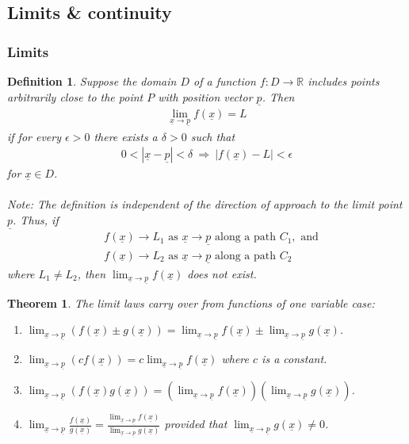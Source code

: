 \documentclass{article}
\theoremstyle{sltheorem}
\newtheorem{definition}{Definition}[section]
\newtheorem{theorem}{Theorem}[section]
\newcommand{\R}{\mathbb{R}}
\renewcommand{\vec}{\underline}
\begin{document}
\subsection{Limits \& continuity}
\subsubsection{Limits}
\begin{definition}
    Suppose the domain $D$ of a function $f:D\to\R$ includes points
    arbitrarily close to the point $P$ with position vector $\vec p$.
    Then
    \begin{align*}
        \lim_{\vec x\to \vec p}f(\vec x)=L
    \end{align*}
    if for every $\epsilon>0$ there exists a $\delta > 0$ such that
    \begin{align*}
        0 < |\vec x - \vec p| < \delta \:\Rightarrow\: |f(\vec x)-L|<\epsilon
    \end{align*}
    for $\vec x \in D$.\\\\
    Note: The definition is independent of the direction of approach to the
    limit point $\vec p$. Thus, if
    \begin{align*}
        &f(\vec x)\to L_1 \text{ as } \vec x\to\vec p \text{ along a path } C_1, \text{ and}\\
        &f(\vec x)\to L_2 \text{ as } \vec x\to\vec p \text{ along a path } C_2
    \end{align*}
    where $L_1 \not= L_2$, then $\lim_{\vec x\to\vec p} f(\vec x)$ does not exist.
\end{definition}
\begin{theorem}
    The limit laws carry over from functions of one variable case:
    \begin{enumerate}
        \item $\lim_{\vec x\to\vec p}\left(f(\vec x)\pm g(\vec x)\right) =
               \lim_{\vec x\to\vec p}f(\vec x)\pm\lim_{\vec x\to\vec p}g(\vec x)$.
        \item $\lim_{\vec x\to\vec p}\left(cf(\vec x)\right) =
              c\lim_{\vec x\to\vec p}f(\vec x)$ where $c$ is a constant.
        \item $\lim_{\vec x\to\vec p}\left(f(\vec x)g(\vec x)\right) =
               \left(\lim_{\vec x\to\vec p}f(\vec x)\right)
               \left(\lim_{\vec x\to\vec p}g(\vec x)\right)$.
        \item $\lim_{\vec x\to\vec p}\frac{f(\vec x)}{g(\vec x)}
               =\frac{\lim_{\vec x\to\vec p}f(\vec x)}{\lim_{\vec x\to\vec p}g(\vec x)}$
               provided that $\lim_{\vec x\to\vec p}g(\vec x)\not=0$.
    \end{enumerate}
\end{theorem}
\end{document}
